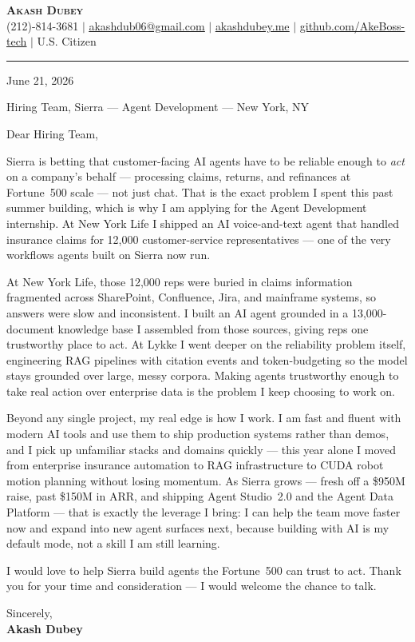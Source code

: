 \documentclass[letterpaper,11pt]{article}
\begin{document}
\begin{center}
    \textbf{\Huge \scshape Akash Dubey} \\ \vspace{2pt}
    \small (212)-814-3681 $|$ \href{mailto:akashdub06@gmail.com}{\underline{akashdub06@gmail.com}} $|$
    \href{https://akashdubey.me/}{\underline{akashdubey.me}} $|$
    \href{https://github.com/AkeBoss-tech}{\underline{github.com/AkeBoss-tech}} $|$
    \small U.S. Citizen
\end{center}
\vspace{4pt}
\hrule
\vspace{10pt}

June 21, 2026

\vspace{2pt}
Hiring Team, Sierra --- Agent Development --- New York, NY

\vspace{6pt}
Dear Hiring Team,

Sierra is betting that customer-facing AI agents have to be reliable enough to
\emph{act} on a company's behalf --- processing claims, returns, and refinances at
Fortune~500 scale --- not just chat. That is the exact problem I spent this past
summer building, which is why I am applying for the Agent Development internship.
At New York Life I shipped an AI voice-and-text agent that handled insurance
claims for 12,000 customer-service representatives --- one of the very workflows
agents built on Sierra now run.

At New York Life, those 12,000 reps were buried in claims information fragmented
across SharePoint, Confluence, Jira, and mainframe systems, so answers were slow
and inconsistent. I built an AI agent grounded in a 13,000-document knowledge base
I assembled from those sources, giving reps one trustworthy place to act. At Lykke
I went deeper on the reliability problem itself, engineering RAG pipelines with
citation events and token-budgeting so the model stays grounded over large, messy
corpora. Making agents trustworthy enough to take real action over enterprise data
is the problem I keep choosing to work on.

Beyond any single project, my real edge is how I work. I am fast and fluent with
modern AI tools and use them to ship production systems rather than demos, and I
pick up unfamiliar stacks and domains quickly --- this year alone I moved from
enterprise insurance automation to RAG infrastructure to CUDA robot motion planning
without losing momentum. As Sierra grows --- fresh off a \$950M raise, past \$150M
in ARR, and shipping Agent Studio~2.0 and the Agent Data Platform --- that is
exactly the leverage I bring: I can help the team move faster now and expand into
new agent surfaces next, because building with AI is my default mode, not a skill I
am still learning.

I would love to help Sierra build agents the Fortune~500 can trust to act. Thank
you for your time and consideration --- I would welcome the chance to talk.

\vspace{6pt}
Sincerely, \\
\textbf{Akash Dubey}
\end{document}
